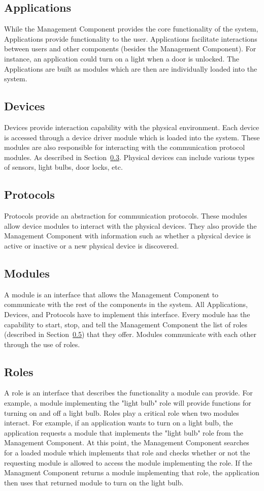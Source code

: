 \subsection{Applications}
\label{sec:apps}
While the Management Component provides the core functionality of the system,
Applications provide functionality to the user. Applications facilitate
interactions between users and other components (besides the Management
Component). For instance, an application could turn on a light when a door is
unlocked. The Applications are built as modules which are then are individually
loaded into the system.
\subsection{Devices}
\label{sec:devices}
Devices provide interaction capability with the physical environment. Each
device is accessed through a device driver module which is loaded into the
system. These modules are also responsible for interacting with the
communication protocol modules. As described in Section~\ref{sec:protocols}.
Physical devices can include various types of sensors, light bulbs, door locks,
etc.
\subsection{Protocols}
\label{sec:protocols}
Protocols provide an abstraction for communication protocols. These modules
allow device modules to interact with the physical devices. They also provide
the Management Component with information such as whether a physical device is
active or inactive or a new physical device is discovered.
\subsection{Modules}
\label{sec:mods}
A module is an interface that allows the Management Component to communicate
with the rest of the components in the system. All Applications, Devices, and
Protocols have to implement this interface. Every module has the capability to
start, stop, and tell the Management Component the list of roles (described in 
Section~\ref{sec:roles}) that they offer. Modules communicate with each
other through the use of roles.
\subsection{Roles}
\label{sec:roles}
A role is an interface that describes the functionality a module can provide. 
For example, a module implementing the "light bulb" role will provide functions
for turning on and off a light bulb. Roles play a critical role when two
modules interact. For example, if an application wants to turn on a light bulb,
the application requests a module that implements the "light bulb" role from 
the Management Component. At this point, the Management Component searches for a
loaded module which implements that role and checks whether or not the
requesting module is allowed to access the module implementing the role. If the
Managment Component returns a module implementing that role, the application
then uses that returned module to turn on the light bulb.
